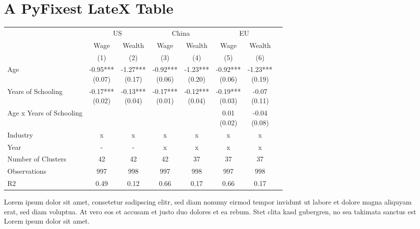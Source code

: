 \documentclass{article}%
\begin{document}
%
\normalsize%
\section{A PyFixest LateX Table}%
\label{sec:APyFixestLateXTable}%


\begin{table}[htbp]%
\renewcommand\cellalign{t}
\begin{threeparttable}
\begin{tabular}{lccccccc}
\toprule
 & \multicolumn{2}{c}{US} & \multicolumn{2}{c}{China} & \multicolumn{2}{c}{EU} \\
\cmidrule(lr){2-3} \cmidrule(lr){4-5} \cmidrule(lr){6-7} 
 & Wage & Wealth & Wage & Wealth & Wage & Wealth \\
 & (1) & (2) & (3) & (4) & (5) & (6) \\
\midrule
\addlinespace
Age & \makecell{-0.95*** \\ (0.07)} & \makecell{-1.27*** \\ (0.17)} & \makecell{-0.92*** \\ (0.06)} & \makecell{-1.23*** \\ (0.20)} & \makecell{-0.92*** \\ (0.06)} & \makecell{-1.23*** \\ (0.19)} \\
Years of Schooling & \makecell{-0.17*** \\ (0.02)} & \makecell{-0.13*** \\ (0.04)} & \makecell{-0.17*** \\ (0.01)} & \makecell{-0.12*** \\ (0.04)} & \makecell{-0.19*** \\ (0.03)} & \makecell{-0.07 \\ (0.11)} \\
Age x Years of Schooling &  &  &  &  & \makecell{0.01 \\ (0.02)} & \makecell{-0.04 \\ (0.08)} \\
\midrule
\addlinespace
Industry & x & x & x & x & x & x \\
Year & - & - & x & x & x & x \\
\midrule
\addlinespace
Number of Clusters & 42 & 42 & 42 & 37 & 37 & 37 \\
Observations & 997 & 998 & 997 & 998 & 997 & 998 \\
R2 & 0.49 & 0.12 & 0.66 & 0.17 & 0.66 & 0.17 \\
\bottomrule
\end{tabular}
\footnotesize Lorem ipsum dolor sit amet, consetetur sadipscing elitr, sed diam nonumy eirmod tempor invidunt ut labore et dolore magna aliquyam erat, sed diam voluptua. At vero eos et accusam et justo duo dolores et ea rebum. Stet clita kasd gubergren, no sea takimata sanctus est Lorem ipsum dolor sit amet.
\end{threeparttable}%
\end{table}

%
\end{document}
